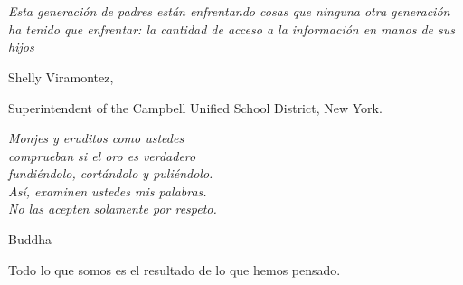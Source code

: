 
\ifdefined\espanol
{}
\section*{~}


\begin{center}
\scalebox{1.5}{a J, J \amper\ T}
\end{center}

\begin{center}
\begin{minipage}[h]{0.6\linewidth}
\it{\odq Esta generaci\'on de padres est\'an enfrentando cosas que ninguna
otra generaci\'on ha tenido que enfrentar: la cantidad de acceso a la
informaci\'on en manos de sus hijos\cdq}


\hfill Shelly Viramontez,

\hfill Superintendent of the Campbell Unified School District, New York.
\end{minipage}
\end{center}

\vspace{1cm}


\begin{center}
\begin{minipage}[b]{0.51\linewidth}
\it{Monjes y eruditos como ustedes\\
comprueban si el oro es verdadero \\
fundi\'endolo, cort\'andolo y puli\'endolo.\\
As\'i, examinen ustedes mis palabras.\\
No las acepten solamente por respeto.}

\vspace{1cm}

\hfill Buddha
\end{minipage}
\end{center}


\vspace{2cm}

\hfill Todo lo que somos es el resultado de lo que hemos pensado.

